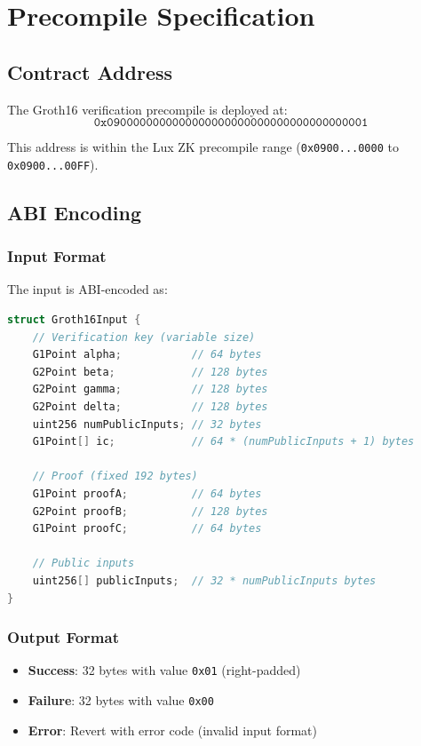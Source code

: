 \documentclass[11pt,a4paper]{article}
\theoremstyle{definition}
\begin{document}
\section{Precompile Specification}

\subsection{Contract Address}

The Groth16 verification precompile is deployed at:
\[
\texttt{0x0900000000000000000000000000000000000001}
\]

This address is within the Lux ZK precompile range (\texttt{0x0900...0000} to \texttt{0x0900...00FF}).

\subsection{ABI Encoding}

\subsubsection{Input Format}

The input is ABI-encoded as:
\begin{lstlisting}[language=C]
struct Groth16Input {
    // Verification key (variable size)
    G1Point alpha;           // 64 bytes
    G2Point beta;            // 128 bytes
    G2Point gamma;           // 128 bytes
    G2Point delta;           // 128 bytes
    uint256 numPublicInputs; // 32 bytes
    G1Point[] ic;            // 64 * (numPublicInputs + 1) bytes

    // Proof (fixed 192 bytes)
    G1Point proofA;          // 64 bytes
    G2Point proofB;          // 128 bytes
    G1Point proofC;          // 64 bytes

    // Public inputs
    uint256[] publicInputs;  // 32 * numPublicInputs bytes
}
\end{lstlisting}

\subsubsection{Output Format}

\begin{itemize}
    \item \textbf{Success}: 32 bytes with value \texttt{0x01} (right-padded)
    \item \textbf{Failure}: 32 bytes with value \texttt{0x00}
    \item \textbf{Error}: Revert with error code (invalid input format)
\end{itemize}
\end{document}
